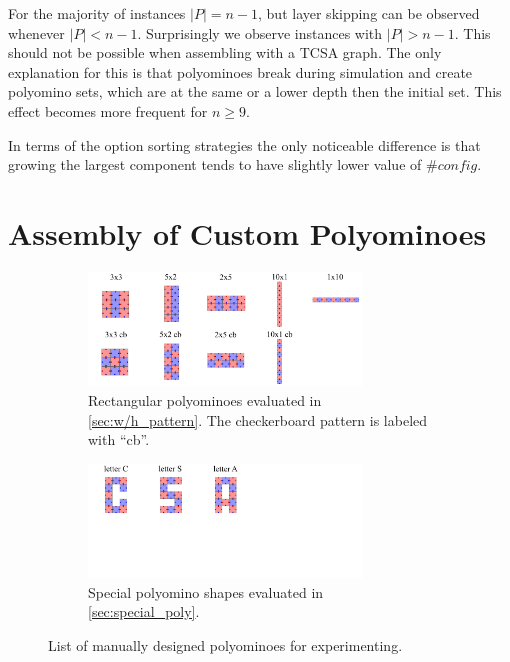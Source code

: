 For the majority of instances $|P| = n-1$, but layer skipping can be observed whenever $|P| < n-1$.
Surprisingly we observe instances with $|P| > n-1$.
This should not be possible when assembling with a TCSA graph.
The only explanation for this is that polyominoes break during simulation and create polyomino sets, which are at the same or a lower depth then the initial set.
This effect becomes more frequent for $n \geq 9$.

In terms of the option sorting strategies the only noticeable difference is that growing the largest component tends to have slightly lower value of $\#\textit{config}$.



\section{Assembly of Custom Polyominoes}
\label{sec:AFTS}

\begin{figure}
	\centering
	\begin{subfigure}[b]{\textwidth}
		\centering
		\includegraphics[width=0.8\textwidth]{figures/AFTS_cb_shapes.pdf}
		\caption{Rectangular polyominoes evaluated in \ref{sec:w/h_pattern}. The checkerboard pattern is labeled with ``cb''. \hfill}
		\label{fig:AFTS_cb_shapes}
	\end{subfigure}
	\begin{subfigure}[b]{\textwidth}
		\centering
		\includegraphics[width=0.8\textwidth]{figures/AFTS_sp_shapes.pdf}
		\caption{Special polyomino shapes evaluated in \autoref{sec:special_poly}.}
		\label{fig:AFTS_sp_shapes}
	\end{subfigure}
	\caption[List of manually designed polyominoes for experimenting]{List of manually designed polyominoes for experimenting.}
	\label{fig:AFTS_shapes}
\end{figure}

